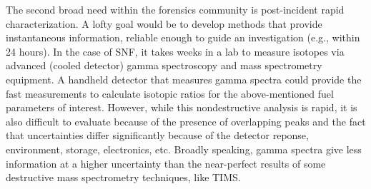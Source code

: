 The second broad need within the forensics community is post-incident rapid
characterization. A lofty goal would be to develop methods that provide
instantaneous information, reliable enough to guide an investigation (e.g.,
within 24 hours). In the case of \gls{SNF}, it takes weeks in a lab to measure
isotopes via advanced (cooled detector) gamma spectroscopy and mass
spectrometry equipment. A handheld detector that measures gamma spectra could
provide the fast measurements to calculate isotopic ratios for the
above-mentioned fuel parameters of interest.  However, while this
nondestructive analysis is rapid, it is also difficult to evaluate because of
the presence of overlapping peaks and the fact that uncertainties differ
significantly because of the detector reponse, environment, storage,
electronics, etc. Broadly speaking, gamma spectra give less information at a
higher uncertainty than the near-perfect results of some destructive mass
spectrometry techniques, like TIMS.

